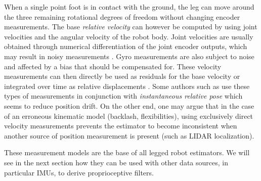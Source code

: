 When a single point foot is in contact with the ground, the leg can move around the three remaining rotational degrees of freedom without changing encoder measurements.
The base \textit{relative velocity} can however be computed by using joint velocities and the angular velocity of the robot body. 
Joint velocities are usually obtained through numerical differentiation of the joint encoder outputs, which may result in noisy measurements \cite{rotella2016imu}.
Gyro measurements are also subject to noise and affected by a bias that should be compensated for. These velocity measurements can then directly be used as
residuals for the base velocity \cite{bloesch2013stateSlippery,bledt2018cheetah} or integrated over time as relative 
displacements \cite{ma2012robust, wisth2020preintegrated}. Some authors such as \cite{bloesch2013stateSlippery, bledt2018cheetah} 
use these types of measurements in conjunction with \textit{instantaneous relative pose} which seems to reduce position drift. On the other end,
one may argue \cite{fallon2014drift} that in the case of an erroneous kinematic model (backlash, flexibilities), using exclusively direct velocity measurements
prevents the estimator to become inconsistent when another source of position measurement is present (such as LIDAR localization). 


These measurement models are the base of all legged robot estimators. We will see in the next section how they can be used with other data sources, 
in particular IMUs, to derive proprioceptive filters.



